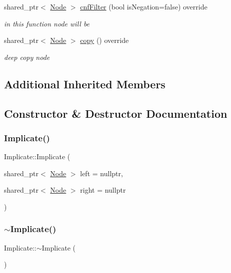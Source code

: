 \begin{DoxyCompactItemize}
shared\+\_\+ptr$<$ \hyperlink{class_node}{Node} $>$ \hyperlink{class_implicate_a84e18887eae8891eec583aafaf2bf63d}{cnf\+Filter} (bool is\+Negation=false) override
\begin{DoxyCompactList}\small\item\em in this function node will be \end{DoxyCompactList}\item 
shared\+\_\+ptr$<$ \hyperlink{class_node}{Node} $>$ \hyperlink{class_implicate_a08cf8aa03589f7a34400a5f636f1256a}{copy} () override
\begin{DoxyCompactList}\small\item\em deep copy node \end{DoxyCompactList}\end{DoxyCompactItemize}
\subsection*{Additional Inherited Members}


\subsection{Constructor \& Destructor Documentation}
\mbox{\label{class_implicate_a7386039d72650d3da8562144b1868722}} 
\subsubsection{\texorpdfstring{Implicate()}{Implicate()}}
{\footnotesize\ttfamily Implicate\+::\+Implicate (\begin{DoxyParamCaption}\item[{shared\+\_\+ptr$<$ \hyperlink{class_node}{Node} $>$}]{left = {\ttfamily nullptr},  }\item[{shared\+\_\+ptr$<$ \hyperlink{class_node}{Node} $>$}]{right = {\ttfamily nullptr} }\end{DoxyParamCaption})\hspace{0.3cm}{\ttfamily [explicit]}}

\mbox{\label{class_implicate_a8339c7a4895d95f6c06d7db5714ab8b3}} 
\subsubsection{\texorpdfstring{$\sim$\+Implicate()}{~Implicate()}}
{\footnotesize\ttfamily Implicate\+::$\sim$\+Implicate (\begin{DoxyParamCaption}{ }\end{DoxyParamCaption})\hspace{0.3cm}{\ttfamily [override]}}



